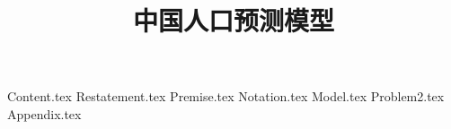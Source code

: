 \documentclass{article}     %
\title{中国人口预测模型}
\author{}
\begin{document}
{Content.tex}
{Restatement.tex}
{Premise.tex}
{Notation.tex}
{Model.tex}
{Problem2.tex}
{Appendix.tex}
\end{document}
